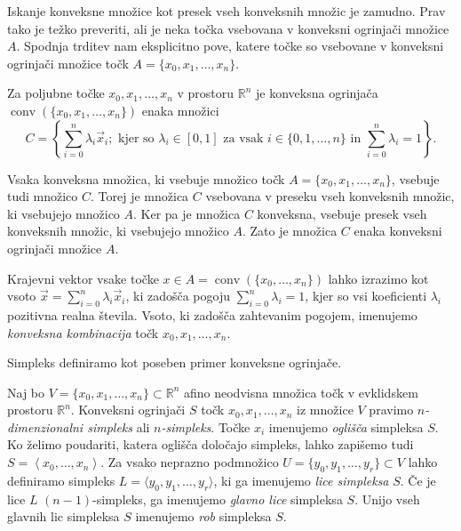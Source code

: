 \documentclass[mat1]{fmfdelo}
\newcommand{\R}{\mathbb R}
\DeclareMathOperator{\conv}{conv}
\newcommand{\0}{\underline{0}}
\begin{document}
Iskanje konveksne množice kot presek vseh konveksnih množic je zamudno. Prav tako je težko preveriti, ali je neka točka vsebovana v konveksni ogrinjači množice $A$. Spodnja trditev nam eksplicitno pove, katere točke so vsebovane v konveksni ogrinjači množice točk $A = \{x_0, x_1, \dots, x_n\}$.
\begin{trditev}
Za poljubne točke $x_0, x_1, \dots, x_n$ v prostoru $\R^n$ je konveksna ogrinjača $\conv(\{x_0, x_1, \dots, x_n\})$ enaka množici
$$C = \left \{ \sum\limits_{i=0}^n \lambda_i \vec{x}_i; \text{ kjer so } \lambda_i \in [0, 1] \text{ za vsak } i \in \{0, 1, \dots, n \} \text{ in } \sum\limits_{i=0}^n \lambda_i = 1  \right \}.$$
\end{trditev}
\begin{dokaz}
Vsaka konveksna množica, ki vsebuje množico točk $A = \{ x_0, x_1, \dots, x_n \}$, vsebuje tudi množico $C$. Torej je množica $C$ vsebovana v preseku vseh konveksnih množic, ki vsebujejo množico $A$. Ker pa je množica $C$ konveksna, vsebuje presek vseh konveksnih množic, ki vsebujejo množico $A$. Zato je množica $C$ enaka konveksni ogrinjači množice $A$.
\end{dokaz}
Krajevni vektor vsake točke $x \in A = \conv (\{x_0, \dots, x_n\})$ lahko izrazimo kot vsoto $\vec{x} = \sum\limits_{i=0}^n \lambda_i \vec{x}_i$, ki zadošča pogoju $\sum\limits_{i=0}^n \lambda_i = 1$, kjer so vsi koeficienti $\lambda_i$ pozitivna realna števila. Vsoto, ki zadošča zahtevanim pogojem, imenujemo \emph{konveksna kombinacija} točk $x_0, x_1, \dots , x_n$. 

Simpleks definiramo kot poseben primer konveksne ogrinjače.
\begin{definicija}
Naj bo $V = \{x_0, x_1, \dots , x_n \} \subset \R^n$ afino neodvisna množica točk v evklidskem prostoru $\R^n$. Konveksni ogrinjači $S$ točk $x_0, x_1, \dots , x_n$ iz množice $V$ pravimo \emph{$n$-dimenzionalni simpleks} ali \emph{$n$-simpleks}. Točke $x_i$ imenujemo \emph{oglišča} simpleksa $S$. Ko želimo poudariti, katera oglišča določajo simpleks, lahko zapišemo tudi $S = \left < x_0, \dots, x_n \right >$. Za vsako neprazno podmnožico $U = \{ y_0, y_1, \dots, y_r \} \subset V$ lahko definiramo simpleks $L = \langle y_0, y_1, \dots, y_r \rangle$, ki ga imenujemo \emph{lice simpleksa} $S$. Če je lice $L$ $(n-1)$-simpleks, ga imenujemo \emph{glavno lice} simpleksa $S$. Unijo vseh glavnih lic simpleksa $S$ imenujemo \emph{rob} simpleksa $S$.
\end{definicija}
\end{document}
